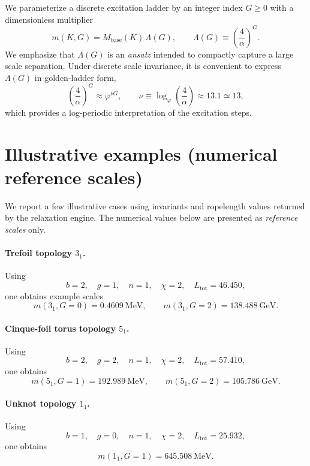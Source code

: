 \documentclass[11pt, a4paper]{article}
\newcommand{\Ltot}{L_{\text{tot}}}
\newcommand{\goldenratio}{\varphi}
\newcommand{\alphafs}{\alpha}
\begin{document}
We parameterize a discrete excitation ladder by an integer index \(G\ge 0\) with a dimensionless multiplier
\begin{equation}
m(K,G) = M_{\mathrm{base}}(K)\,\Lambda(G),
\qquad
\Lambda(G) \equiv \left(\frac{4}{\alphafs}\right)^G.
\label{eq:mKG}
\end{equation}
We emphasize that \(\Lambda(G)\) is an \emph{ansatz} intended to compactly capture a large scale separation. Under discrete scale invariance, it is convenient to express \(\Lambda(G)\) in golden-ladder form,
\begin{equation}
\left(\frac{4}{\alphafs}\right)^G \approx \goldenratio^{\nu G},
\qquad
\nu \equiv \log_{\goldenratio}\!\left(\frac{4}{\alphafs}\right)\approx 13.1 \simeq 13,
\label{eq:nu}
\end{equation}
which provides a log-periodic interpretation of the excitation steps.

\section{Illustrative examples (numerical reference scales)}
\label{sec:examples}

We report a few illustrative cases using invariants and ropelength values returned by the relaxation engine.
The numerical values below are presented as \emph{reference scales} only.

\paragraph{Trefoil topology \(3_1\).}
Using
\[
b=2,\quad g=1,\quad n=1,\quad \chi=2,\quad \Ltot=46.450,
\]
one obtains example scales
\[
m(3_1,G=0)=0.4609~\mathrm{MeV},\qquad
m(3_1,G=2)=138.488~\mathrm{GeV}.
\]

\paragraph{Cinque-foil torus topology \(5_1\).}
Using
\[
b=2,\quad g=2,\quad n=1,\quad \chi=2,\quad \Ltot=57.410,
\]
one obtains
\[
m(5_1,G=1)=192.989~\mathrm{MeV},\qquad
m(5_1,G=2)=105.786~\mathrm{GeV}.
\]

\paragraph{Unknot topology \(1_1\).}
Using
\[
b=1,\quad g=0,\quad n=1,\quad \chi=2,\quad \Ltot=25.932,
\]
one obtains
\[
m(1_1,G=1)=645.508~\mathrm{MeV}.
\]
\end{document}
